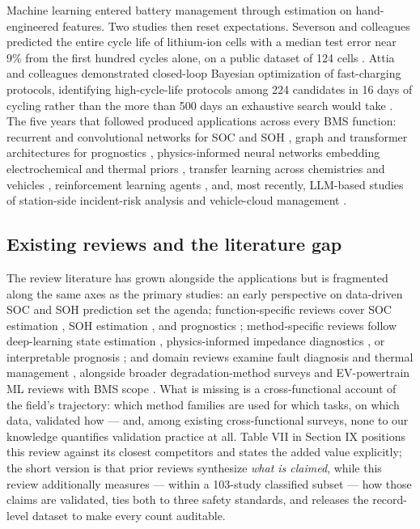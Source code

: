 \documentclass[journal]{IEEEtran}
\begin{document}
Machine learning entered battery management through estimation on hand-engineered features. Two studies then reset expectations. Severson and colleagues predicted the entire cycle life of lithium-ion cells with a median test error near 9\% from the first hundred cycles alone, on a public dataset of 124 cells \cite{r3}. Attia and colleagues demonstrated closed-loop Bayesian optimization of fast-charging protocols, identifying high-cycle-life protocols among 224 candidates in 16 days of cycling rather than the more than 500 days an exhaustive search would take \cite{r4}. The five years that followed produced applications across every BMS function: recurrent and convolutional networks for SOC and SOH \cite{r5}\cite{r6}, graph and transformer architectures for prognostics \cite{r7}\cite{r8}, physics-informed neural networks embedding electrochemical and thermal priors \cite{r9}\cite{r10}, transfer learning across chemistries and vehicles \cite{r11}\cite{r12}, reinforcement learning agents \cite{r13}, and, most recently, LLM-based studies of station-side incident-risk analysis and vehicle-cloud management \cite{r14}\cite{r15}.

\subsection{Existing reviews and the literature gap}

The review literature has grown alongside the applications but is fragmented along the same axes as the primary studies: an early perspective on data-driven SOC and SOH prediction \cite{r16} set the agenda; function-specific reviews cover SOC estimation \cite{r17}\cite{r18}, SOH estimation \cite{r19}, and prognostics \cite{r20}; method-specific reviews follow deep-learning state estimation \cite{r1}, physics-informed impedance diagnostics \cite{r21}, or interpretable prognosis \cite{r22}; and domain reviews examine fault diagnosis \cite{r23}\cite{r24} and thermal management \cite{r25}, alongside broader degradation-method surveys \cite{r26} and EV-powertrain ML reviews with BMS scope \cite{r27}. What is missing is a cross-functional account of the field's trajectory: which method families are used for which tasks, on which data, validated how --- and, among existing cross-functional surveys, none to our knowledge quantifies validation practice at all. Table VII in Section IX positions this review against its closest competitors and states the added value explicitly; the short version is that prior reviews synthesize \textit{what is claimed}, while this review additionally measures --- within a 103-study classified subset --- how those claims are validated, ties both to three safety standards, and releases the record-level dataset to make every count auditable.
\end{document}
